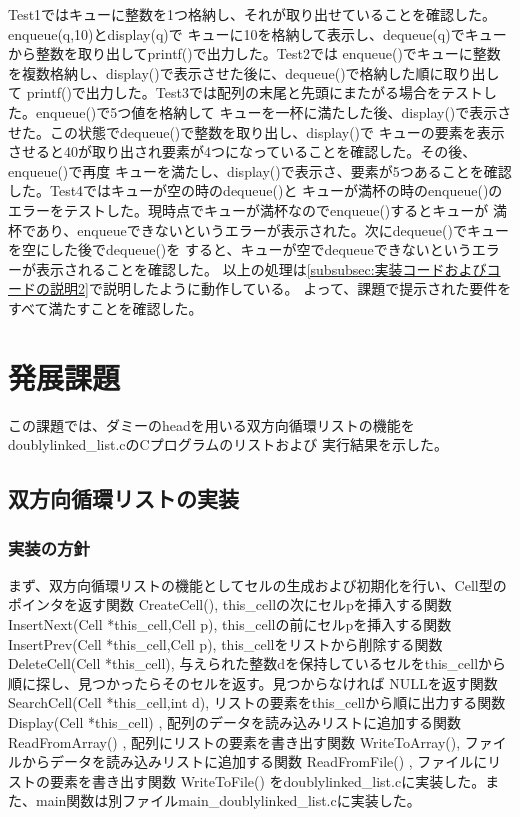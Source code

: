 \documentclass{ltjsarticle}
\begin{document}
Test1ではキューに整数を1つ格納し、それが取り出せていることを確認した。enqueue(q,10)とdisplay(q)で
キューに10を格納して表示し、dequeue(q)でキューから整数を取り出してprintf()で出力した。Test2では
enqueue()でキューに整数を複数格納し、display()で表示させた後に、dequeue()で格納した順に取り出して
printf()で出力した。Test3では配列の末尾と先頭にまたがる場合をテストした。enqueue()で5つ値を格納して
キューを一杯に満たした後、display()で表示させた。この状態でdequeue()で整数を取り出し、display()で
キューの要素を表示させると40が取り出され要素が4つになっていることを確認した。その後、enqueue()で再度
キューを満たし、display()で表示さ、要素が5つあることを確認した。Test4ではキューが空の時のdequeue()と
キューが満杯の時のenqueue()のエラーをテストした。現時点でキューが満杯なのでenqueue()するとキューが
満杯であり、enqueueできないというエラーが表示された。次にdequeue()でキューを空にした後でdequeue()を
すると、キューが空でdequeueできないというエラーが表示されることを確認した。
以上の処理は\ref{subsubsec:実装コードおよびコードの説明2}で説明したように動作している。
よって、課題で提示された要件をすべて満たすことを確認した。

\section{発展課題}
この課題では、ダミーのheadを用いる双方向循環リストの機能をdoublylinked\_list.cのCプログラムのリストおよび
実行結果を示した。
\subsection{双方向循環リストの実装}
\subsubsection{実装の方針}
まず、双方向循環リストの機能としてセルの生成および初期化を行い、Cell型のポインタを返す関数 CreateCell(), 
this\_cellの次にセルpを挿入する関数 InsertNext(Cell *this\_cell,Cell p), this\_cellの前にセルpを挿入する関数 
InsertPrev(Cell *this\_cell,Cell p), this\_cellをリストから削除する関数 DeleteCell(Cell *this\_cell), 
与えられた整数dを保持しているセルをthis\_cellから順に探し、見つかったらそのセルを返す。見つからなければ
NULLを返す関数 SearchCell(Cell *this\_cell,int d), リストの要素をthis\_cellから順に出力する関数 Display(Cell *this\_cell)
, 配列のデータを読み込みリストに追加する関数 ReadFromArray()
, 配列にリストの要素を書き出す関数 WriteToArray(), ファイルからデータを読み込みリストに追加する関数 ReadFromFile()
, ファイルにリストの要素を書き出す関数 WriteToFile()
をdoublylinked\_list.cに実装した。また、main関数は別ファイルmain\_doublylinked\_list.cに実装した。
\end{document}
